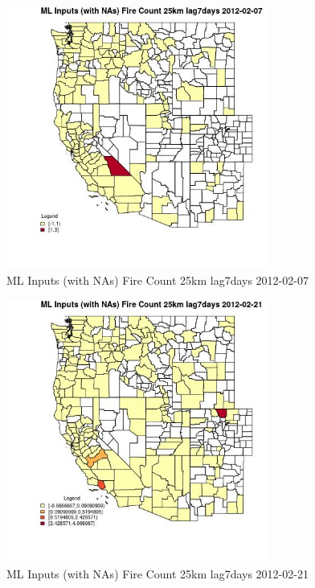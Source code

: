 \begin{figure} 
\centering  
\includegraphics[width=0.77\textwidth]{Code_Outputs/Report_ML_input_PM25_Step4_part_f_de_duplicated_aves_prioritize_24hr_obswNAs_CountyFire_Count_25km_lag7daysMean2012-02-07.jpg} 
\caption{\label{fig:Report_ML_input_PM25_Step4_part_f_de_duplicated_aves_prioritize_24hr_obswNAsCountyFire_Count_25km_lag7daysMean2012-02-07}ML Inputs (with NAs) Fire Count 25km lag7days 2012-02-07} 
\end{figure} 
 

\begin{figure} 
\centering  
\includegraphics[width=0.77\textwidth]{Code_Outputs/Report_ML_input_PM25_Step4_part_f_de_duplicated_aves_prioritize_24hr_obswNAs_CountyFire_Count_25km_lag7daysMean2012-02-21.jpg} 
\caption{\label{fig:Report_ML_input_PM25_Step4_part_f_de_duplicated_aves_prioritize_24hr_obswNAsCountyFire_Count_25km_lag7daysMean2012-02-21}ML Inputs (with NAs) Fire Count 25km lag7days 2012-02-21} 
\end{figure} 
 

